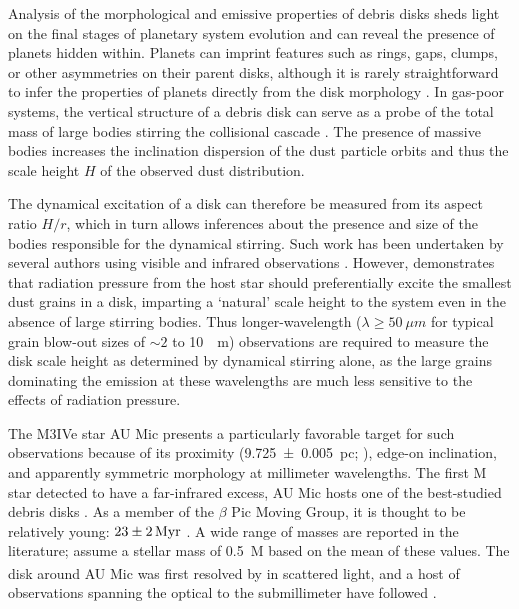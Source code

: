\documentclass[modern]{aastex62}
\begin{document}
Analysis of the morphological and emissive properties of debris disks sheds light on the final stages of planetary system evolution and can reveal the presence of planets hidden within.
Planets can imprint features such as rings, gaps, clumps, or other asymmetries on their parent disks, although it is rarely straightforward to infer the properties of planets directly from the disk morphology \citep[see the review by][and references therein]{hughes18}.
In gas-poor systems, the vertical structure of a debris disk can serve as a probe of the total mass of large bodies stirring the collisional cascade \citep{thebault09}.
The presence of massive bodies increases the inclination dispersion of the dust particle orbits and thus the scale height $H$ of the observed dust distribution.

The dynamical excitation of a disk can therefore be measured from its aspect ratio $H/r$, which in turn allows inferences about the presence and size of the bodies responsible for the dynamical stirring.
Such work has been undertaken by several authors using visible and infrared observations \citep{artymowicz97,thebault&augereau07,quillen07}.
However, \citet{thebault09} demonstrates that radiation pressure from the host star should preferentially excite the smallest dust grains in a disk, imparting a `natural' scale height to the system even in the absence of large stirring bodies. 
Thus longer-wavelength ($\lambda \geq \SI{50}{\mu m}$ for typical grain blow-out sizes of $\sim 2$ to \SI{10}{\mu m}) observations are required to measure the disk scale height as determined by dynamical stirring alone, as the large grains dominating the emission at these wavelengths are much less sensitive to the effects of radiation pressure.

The M3IVe star AU Mic presents a particularly favorable target for such observations
because of
its proximity (\SI{9.725 \pm 0.005}{pc}; \citealp{gaia16,gaia_DR2}), edge-on inclination, and apparently symmetric morphology at millimeter wavelengths.
The first M star detected to have a far-infrared excess, AU Mic hosts one of the best-studied debris disks \citep{moshir90}. 
As a member of the $\beta$ Pic Moving Group, it is thought to be relatively young: $\SI{23 \pm 2}{Myr}$ \citep{binks&jeffries14,mamajek&bell14,malo14}. 
A wide range of masses \citep[\SIrange{0.3}{0.6}{M_\sun};][]{plavchan09,houdebine&doyle94} are reported in the literature; \citet{schuppler17} assume a stellar mass of \SI{0.5}{M_\sun} based on the mean of these values.
The disk around AU Mic was first resolved by \citet{kalas04} in scattered light, and a host of observations spanning the optical to the submillimeter have followed \citep{augereau&beust06,macgregor13,schneider14,matthews15,wang15}. 
\end{document}
